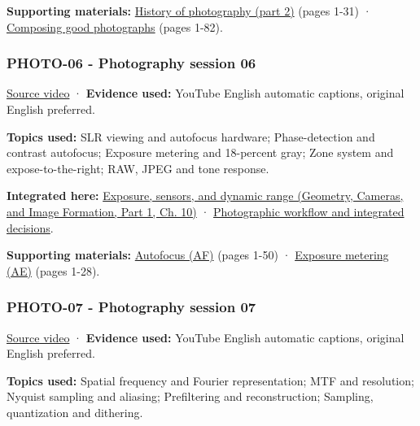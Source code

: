 \textbf{Supporting materials:} \href{https://drive.google.com/open?id=0B6w2XfPHEcZYNm5MczhBTkxsanc}{History of photography (part 2)} (pages 1-31) · \href{https://drive.google.com/file/d/0B6w2XfPHEcZYSkZXWG9mSGpFMVk/view?usp=sharing}{Composing good photographs} (pages 1-82).

\subsubsection{PHOTO-06 - Photography session 06}\label{04-visual-computing-ii-ch036-photo-06---photography-session-06}

\hypertarget{04-visual-computing-ii-ch036-photo-06---photography-session-06}{}

\href{https://www.youtube.com/watch?v=njlDb9-6aOU}{Source video} · \textbf{Evidence used:} YouTube English automatic captions, original English preferred.

\textbf{Topics used:} SLR viewing and autofocus hardware; Phase-detection and contrast autofocus; Exposure metering and 18-percent gray; Zone system and expose-to-the-right; RAW, JPEG and tone response.

\textbf{Integrated here:} \href{../03-Geometry-Cameras-and-Image-Formation-P01/main.pdf\#03-visual-computing-i-ch003-exposure-sensors-and-dynamic-range}{Exposure, sensors, and dynamic range (Geometry, Cameras, and Image Formation, Part 1, Ch. 10)} · \hyperref[04-visual-computing-ii-ch034-photographic-workflow-and-integrated-decisions]{Photographic workflow and integrated decisions}.

\textbf{Supporting materials:} \href{https://drive.google.com/open?id=0B6w2XfPHEcZYQnR3SG43Z2VIRmM}{Autofocus (AF)} (pages 1-50) · \href{https://drive.google.com/open?id=0B6w2XfPHEcZYbG9EWlhacm80SFE}{Exposure metering (AE)} (pages 1-28).

\subsubsection{PHOTO-07 - Photography session 07}\label{04-visual-computing-ii-ch036-photo-07---photography-session-07}

\hypertarget{04-visual-computing-ii-ch036-photo-07---photography-session-07}{}

\href{https://www.youtube.com/watch?v=02tgqvQzp0Y}{Source video} · \textbf{Evidence used:} YouTube English automatic captions, original English preferred.

\textbf{Topics used:} Spatial frequency and Fourier representation; MTF and resolution; Nyquist sampling and aliasing; Prefiltering and reconstruction; Sampling, quantization and dithering.

